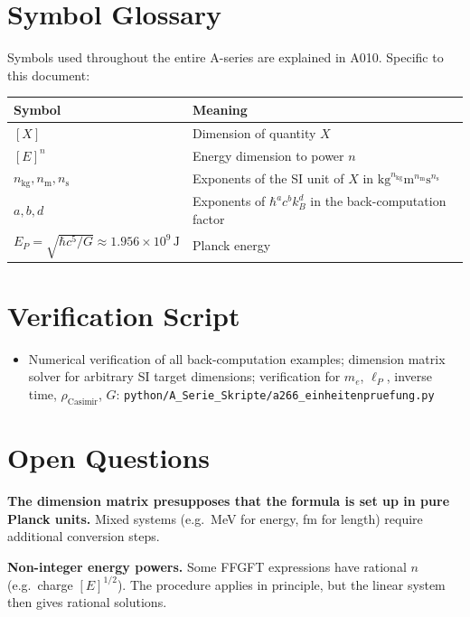 \section{Symbol Glossary}

Symbols used throughout the entire A-series are explained in A010.
Specific to this document:

\begin{center}
\renewcommand{\arraystretch}{1.3}
{\small\begin{tabular}{lp{9cm}}
\toprule
Symbol & Meaning \\
\midrule
$[X]$ & Dimension of quantity $X$ \\
$[E]^n$ & Energy dimension to power $n$ \\
$n_\text{kg},n_\text{m},n_\text{s}$ & Exponents of the SI unit of $X$
  in $\text{kg}^{n_\text{kg}}\text{m}^{n_\text{m}}\text{s}^{n_\text{s}}$ \\
$a,b,d$ & Exponents of $\hbar^a c^b k_B^d$ in the back-computation factor \\
$E_P = \sqrt{\hbar c^5/G}\approx1{.}956\times10^9\,\text{J}$ & Planck energy \\
\bottomrule
\end{tabular}}
\renewcommand{\arraystretch}{1.0}
\end{center}

\section{Verification Script}

\begin{itemize}[leftmargin=2em,itemsep=2pt,topsep=2pt]
  \item Numerical verification of all back-computation examples; dimension matrix
    solver for arbitrary SI target dimensions; verification for $m_e$, $\ell_P$,
    inverse time, $\rho_\text{Casimir}$, $G$:
    \texttt{python/A\_Serie\_Skripte/a266\_einheitenpruefung.py}
\end{itemize}

\section{Open Questions}

\textbf{The dimension matrix presupposes that the formula is set up in pure Planck
units.} Mixed systems (e.g.\ MeV for energy, fm for length) require additional
conversion steps.

\textbf{Non-integer energy powers.} Some FFGFT expressions have rational $n$
(e.g.\ charge $[E]^{1/2}$). The procedure applies in principle, but the linear
system then gives rational solutions.

